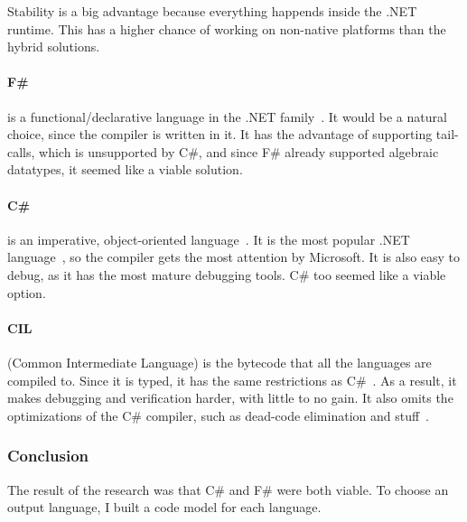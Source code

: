 Stability is a big advantage because everything happends inside the .NET runtime.
This has a higher chance of working on non-native platforms than the hybrid solutions.

\paragraph{F\#} is a functional/declarative language in the .NET family~\cite{fsharp}.
It would be a natural choice, since the compiler is written in it.
It has the advantage of supporting tail-calls, which is unsupported by C\#,
  and since F\# already supported algebraic datatypes, it seemed like a viable solution.


\paragraph{C\#}
is an imperative, object-oriented language~\cite{csharp}.
It is the most popular .NET language~\cite{Meyerovich}, so the compiler gets the most attention by Microsoft.
It is also easy to debug, as it has the most mature debugging tools.
C\# too seemed like a viable option.


\paragraph{CIL}
(Common Intermediate Language) is the bytecode that all the languages are compiled to.
Since it is typed, it has the same restrictions as C\#~\cite{source}.
As a result, it makes debugging and verification harder, with little to no gain.
It also omits the optimizations of the C\# compiler, such as dead-code elimination and stuff~\cite{csharp_optimizations}.

\subsubsection{Conclusion}
The result of the research was that C\# and F\# were both viable.
To choose an output language, I built a code model for each language.

